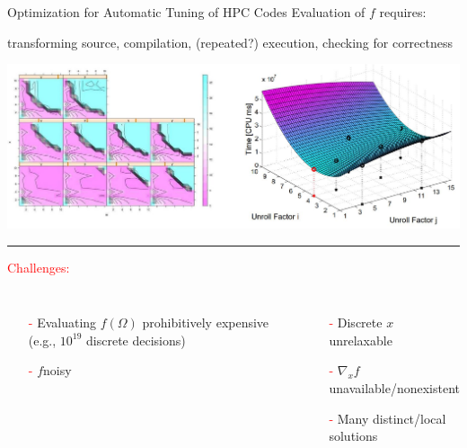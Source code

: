 \documentclass[handout,aspectratio=54]{beamer}
\numberwithin{theorem}{section}
\begin{document}
\begin{frame}{Optimization for Automatic Tuning of HPC Codes}
Evaluation of $f$ requires:

transforming source, compilation, (repeated?) execution, checking for correctness

\includegraphics[width=\textwidth]{fig/14.jpg}

\rule{\textwidth}{1pt}

\textcolor{red}{Challenges:}

\begin{columns}
\begin{itemize}\scriptsize
\item [\textcolor{red}{-}] Evaluating $f(\Omega)$ prohibitively expensive (e.g., $10^{19}$ discrete decisions)
\item [\textcolor{red}{-}] $f$\;noisy
\end{itemize}

\begin{itemize}\scriptsize
\item [\textcolor{red}{-}] Discrete $x$ unrelaxable
\item [\textcolor{red}{-}] $\nabla_x f$ unavailable/nonexistent
\item [\textcolor{red}{-}] Many distinct/local solutions
\end{itemize}
\end{columns}
\end{frame}
\end{document}
